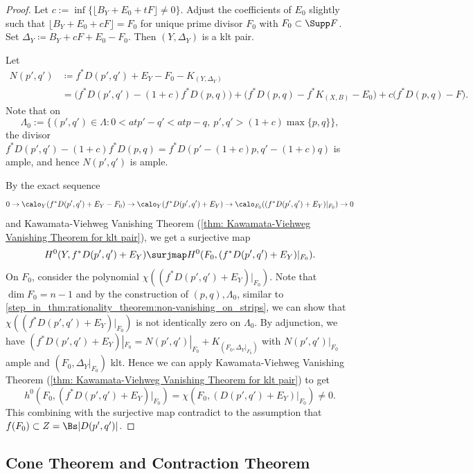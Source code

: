 \begin{proof}
        Let \(c := \inf\{ \lfloor B_Y + E_0 + t F \rfloor \neq 0\}\).
        Adjust the coefficients of \(E_0\) slightly such that \(\lfloor B_Y + E_0 + c F \rfloor = F_0\) for unique prime divisor \(F_0\) with \(F_0 \subset \Supp F\).
        Set \(\Delta_Y \coloneqq B_Y + c F + E_0 - F_0\).
        Then \((Y,\Delta_Y)\) is a klt pair.

        Let
        \begin{align*}
            N(p',q') &\coloneqq f^*D(p',q') + E_Y - F_0 - K_{(Y,\Delta_Y)}  \\
                & = \Big(f^*D(p',q') - (1+c)f^*D(p,q)\Big) + \Big(f^*D(p,q) - f^*K_{(X,B)} - E_0\Big) + c \Big(f^*D(p,q) - F\Big).
        \end{align*}
        Note that on
        \[ \Lambda_0 := \{(p',q') \in \Lambda: 0< atp' - q' < atp - q,\  p',q'>(1+c)\max\{p,q\}\}, \]
        the divisor \(f^*D(p',q') - (1+c)f^*D(p,q) = f^*D(p'-(1+c)p,q'-(1+c)q)\) is ample, and hence \(N(p',q')\) is ample.

        By the exact sequence
        \[ 0 \to \calo_Y(f^*D(p',q')+E_Y-F_0) \to \calo_Y(f^*D(p',q')+E_Y) \to \calo_{F_0}((f^*D(p',q')+E_Y)|_{F_0}) \to 0 \]
        and Kawamata-Viehweg Vanishing Theorem (\cref{thm: Kawamata-Viehweg Vanishing Theorem for klt pair}), we get a surjective map
        \[ H^0(Y,f^*D(p',q')+E_Y) \surjmap H^0(F_0,(f^*D(p',q')+E_Y)|_{F_0}). \]
        On \(F_0\), consider the polynomial \(\chi((f^*D(p',q')+E_Y)|_{F_0})\).
        Note that \(\dim F_0 = n-1\) and by the construction of \((p,q),\Lambda_0\),
        similar to \cref{step_in_thm:rationality_theorem:non-vanishing_on_strips},
        we can show that \(\chi((f^*D(p',q')+E_Y)|_{F_0})\) is not identically zero on \(\Lambda_0\).
        By adjunction, we have \((f^*D(p',q')+E_Y)|_{F_0} = N(p',q')|_{F_0} + K_{(F_0,\Delta_Y|_{F_0})}\) with \(N(p',q')|_{F_0}\) ample and \((F_0,\Delta_Y|_{F_0})\) klt.
        Hence we can apply Kawamata-Viehweg Vanishing Theorem (\cref{thm: Kawamata-Viehweg Vanishing Theorem for klt pair}) to get
        \[ h^0(F_0,(f^*D(p',q')+E_Y)|_{F_0}) = \chi(F_0,(D(p',q')+E_Y)|_{F_0}) \neq 0.\]
        This combining with the surjective map contradict to the assumption that \(f(F_0) \subset Z = \Bs |D(p',q')|\).
    \end{proof}


\subsection{Cone Theorem and Contraction Theorem}

